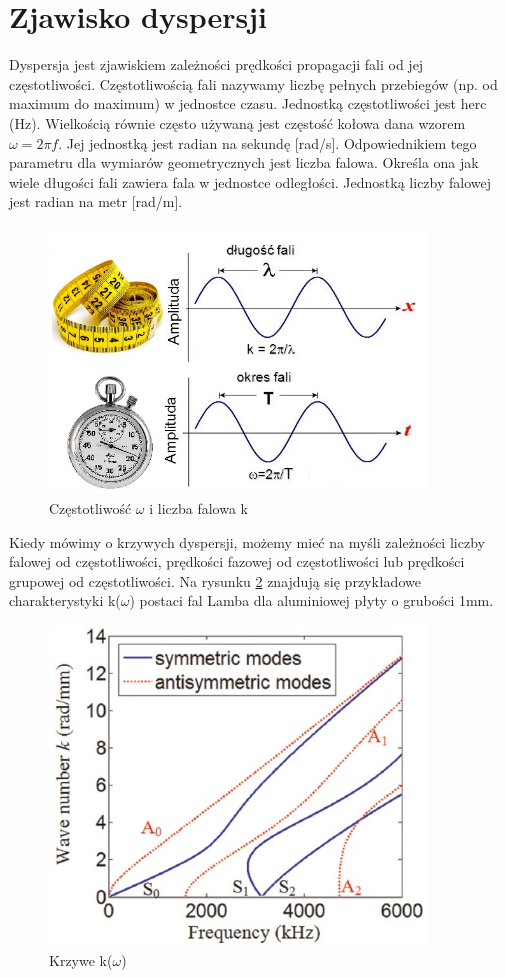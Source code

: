 
\section{Zjawisko dyspersji}
\label{sec:rodzaje_fal_sprezystych}

Dyspersja jest zjawiskiem zależności prędkości propagacji fali od jej częstotliwości. Częstotliwością fali nazywamy liczbę pełnych przebiegów (np. od maximum do maximum) w jednostce czasu. Jednostką częstotliwości jest herc (Hz). Wielkością równie często używaną jest częstość kołowa dana wzorem \( \omega = 2\pi f \). Jej jednostką jest radian na sekundę [rad/s]. Odpowiednikiem tego parametru dla wymiarów geometrycznych jest liczba falowa. Określa ona jak wiele długości fali zawiera fala w jednostce odległości. Jednostką liczby falowej jest radian na metr [rad/m].

\begin{figure}[h]
\centering
\includegraphics[width=10cm]{Zdjecia/2/czestotliwosc1}
\caption{Częstotliwość \( \omega \) i liczba falowa k}
\label{fig:czestotliwosc_i_liczba_falowa}
\end{figure}


Kiedy mówimy o krzywych dyspersji, możemy mieć na myśli zależności liczby falowej od częstotliwości, prędkości fazowej od częstotliwości lub prędkości grupowej od częstotliwości. Na rysunku \ref{fig:krzywe_k_od_omega} znajdują się przykładowe charakterystyki k(\(\omega\)) postaci fal Lamba dla aluminiowej płyty o grubości 1mm.

\begin{figure}[h]
\centering
\includegraphics[width=10cm]{Zdjecia/2/char_fazowa}
\caption{Krzywe k(\(\omega\)) \cite{bartek_tian}}
\label{fig:krzywe_k_od_omega}
\end{figure}

